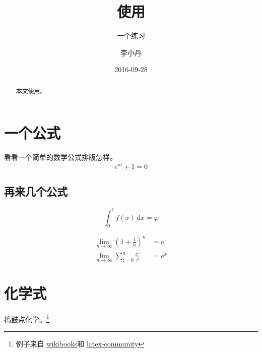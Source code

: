 \documentclass{scrartcl}
\begin{document}
\begin{CJK}{UTF8}{gbsn}

\chead{\headmark}
\cfoot[]{}

\title{使用}
\subtitle{一个练习}
\author{李小丹}
\date{2016-09-28}

\begin{titlepage}

\maketitle

\begin{abstract}
	本文使用。
\end{abstract}

\vspace{1cm}

{\small{\tableofcontents}}

\end{titlepage}



\section{一个公式}
看看一个简单的数学公式排版怎样。\\

\begin{equation}
	e^{\pi i} + 1 = 0
\end{equation}

\subsection{再来几个公式}
\begin{equation}
	\int_0^1 f(x)\,\mathrm{d}x = \varphi
\end{equation}

\begin{align}
	\lim_{n \to \infty} \left(1 + \frac{1}{n} \right) ^ n & = e\\
	\lim_{n \to \infty} \sum_{i=0}^{n} \frac{x^i}{i!} & = e^x
\end{align}

\section{化学式}
捣鼓点化学。\footnote{
	例子来自
	\href{https://en.wikibooks.org/wiki/LaTeX/Chemical\_Graphics}
	{wikibooks}和
	\href{http://latex-community.org/know-how/434-chemistry-molecules}
	{latex-community}} \\


\end{CJK}
\end{document}
